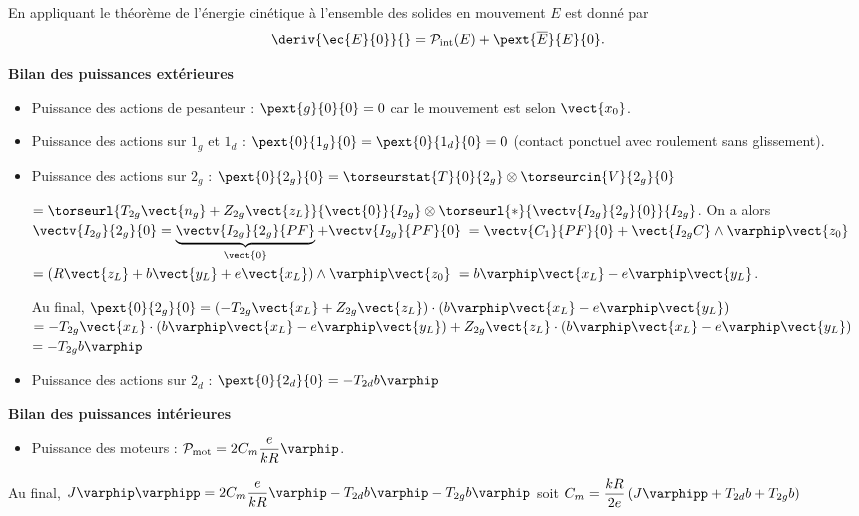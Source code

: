 \ifprof
\begin{corrige}
En appliquant le théorème de l'énergie cinétique à l'ensemble des solides en mouvement $E$ est donné par 
$$
\deriv{\ec{E}{0}}{}  = \mathcal{P}_{\text{int}}(E)+\pext{\overline{E}}{E}{0}.
$$

\textbf{Bilan des puissances extérieures}
\begin{itemize}
\item Puissance des actions de pesanteur : $\pext{g}{0}{0}=0$ car le mouvement est selon $\vect{x_0}$.
\item Puissance des actions sur $1_g$ et $1_d$ : $\pext{0}{1_g}{0}=\pext{0}{1_d}{0}=0$ (contact ponctuel avec roulement sans glissement).
\item Puissance des actions sur $2_g$ : $\pext{0}{2_g}{0} = \torseurstat{T}{0}{2_g} \otimes\torseurcin{V}{2_g}{0}$ 

$=\torseurl{T_{2g}\vect{n_g}+Z_{2g}\vect{z_L}}{\vect{0}}{I_{2g}} \otimes \torseurl{*}{\vectv{I_{2g}}{2_g}{0}}{I_{2g}}$. On a alors 
$\vectv{I_{2g}}{2_g}{0}=\underbrace{\vectv{I_{2g}}{2_g}{PF}}_{\vect{0}}+\vectv{I_{2g}}{PF}{0}$ 
$=\vectv{C_1}{PF}{0} + \vect{I_{2g} C}\wedge \varphip \vect{z_0}$
$= \left(R\vect{z_L}  +b\vect{y_L} +e\vect{x_L}\right)\wedge \varphip \vect{z_0}$
$= b\varphip \vect{x_L} - e \varphip \vect{y_L}$.

Au final, $\pext{0}{2_g}{0} = \left( -T_{2g}\vect{x_L}+Z_{2g}\vect{z_L} \right) \cdot\left( b\varphip \vect{x_L} - e \varphip \vect{y_L}\right)$
$ = -T_{2g}\vect{x_L}\cdot\left( b\varphip \vect{x_L} - e \varphip \vect{y_L}\right)+Z_{2g}\vect{z_L} \cdot\left( b\varphip \vect{x_L} - e \varphip \vect{y_L}\right) $
$ = -T_{2g} b\varphip $

\item Puissance des actions sur $2_d$ : $\pext{0}{2_d}{0}= -T_{2d} b\varphip $
\end{itemize}

\textbf{Bilan des puissances intérieures}
\begin{itemize}
\item Puissance des moteurs : $\mathcal{P}_{\text{mot}} = 2 C_m \dfrac{e}{kR}\varphip$.
\end{itemize}

Au final, 
$J\varphip\varphipp = 2 C_m \dfrac{e}{kR}\varphip -T_{2d} b\varphip-T_{2g} b\varphip$
soit 
$  C_m  =\dfrac{kR}{2e} \left(J\varphipp  +T_{2d} b+T_{2g} b\right) $

\end{corrige}
\else
\fi



